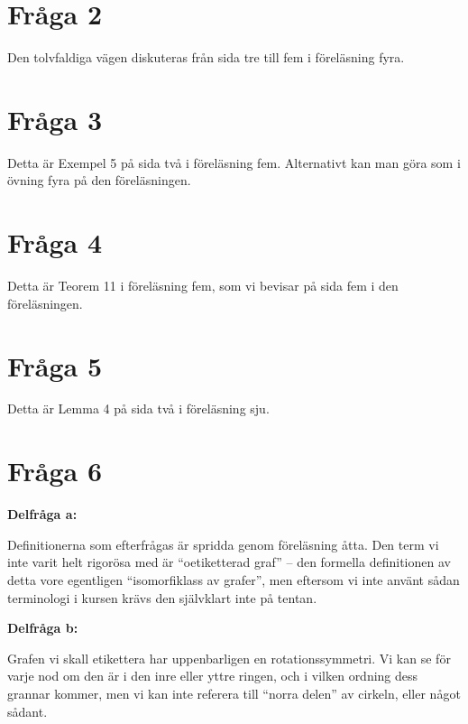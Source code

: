 \documentclass[nobib]{tufte-handout}
\begin{document}
\section{Fråga 2}

Den tolvfaldiga vägen diskuteras från sida tre till fem i föreläsning fyra.

\section{Fråga 3}

Detta är Exempel 5 på sida två i föreläsning fem. Alternativt kan man göra som i övning fyra på den föreläsningen.

\section{Fråga 4}

Detta är Teorem 11 i föreläsning fem, som vi bevisar på sida fem i den föreläsningen.

\section{Fråga 5}

Detta är Lemma 4 på sida två i föreläsning sju.

\section{Fråga 6}

\noindent\textbf{Delfråga a:}

Definitionerna som efterfrågas är spridda genom föreläsning åtta. Den term vi inte varit helt rigorösa med är ``oetiketterad graf'' -- den formella definitionen av detta vore egentligen ``isomorfiklass av grafer'', men eftersom vi inte använt sådan terminologi i kursen krävs den självklart inte på tentan.

\noindent\textbf{Delfråga b:}

Grafen vi skall etikettera har uppenbarligen en rotationssymmetri. Vi kan se för varje nod om den är i den inre eller yttre ringen, och i vilken ordning dess grannar kommer, men vi kan inte referera till ``norra delen'' av cirkeln, eller något sådant.
\end{document}
